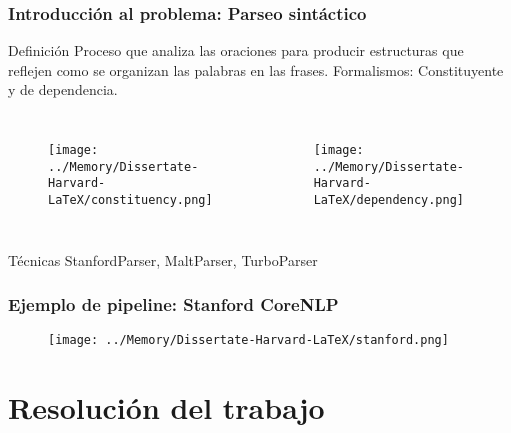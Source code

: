 \documentclass{beamer}
\begin{document}
\begin{frame}
\frametitle{Introducción al problema: Parseo sintáctico}
\begin{block}{Definición}
Proceso que analiza las oraciones para producir estructuras que reflejen como se organizan las palabras en las frases. Formalismos: Constituyente y de dependencia.
\end{block}
\begin{columns}[c]
\begin{figure}
\texttt{[image: ../Memory/Dissertate-Harvard-LaTeX/constituency.png]}
\end{figure}
\begin{figure}
\texttt{[image: ../Memory/Dissertate-Harvard-LaTeX/dependency.png]}
\end{figure}
\end{columns}
\begin{block}{Técnicas}
StanfordParser, MaltParser, TurboParser
\end{block}
\end{frame}

\begin{frame}
\frametitle{Ejemplo de pipeline: Stanford CoreNLP}
\begin{figure}
\texttt{[image: ../Memory/Dissertate-Harvard-LaTeX/stanford.png]}
\end{figure}

\end{frame}

\section{Resolución del trabajo}
\end{document}
